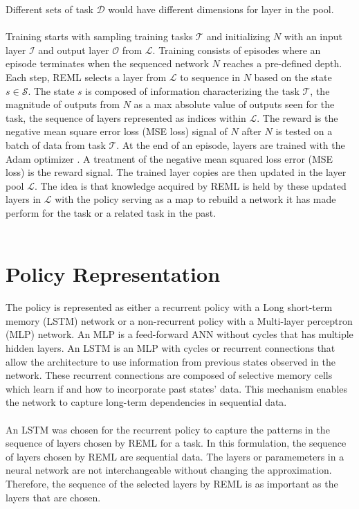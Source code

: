 Different sets of task $\mathcal{D}$ would have different dimensions for layer in
the pool.
\\\\
Training starts with sampling training tasks $\mathcal{T}$ and initializing $N$ 
with an input layer $\mathcal{I}$ and output layer $\mathcal{O}$ from $\mathcal{L}$.
Training consists of episodes where an episode terminates when the 
sequenced network $N$ reaches a pre-defined depth. 
Each step, REML selects a layer from $\mathcal{L}$ to sequence in $N$ based on the
state $s \in \mathcal{S}$. 
The state $s$ is composed of 
information characterizing the task $\mathcal{T}$, 
the magnitude of outputs from $N$ as a max absolute value of outputs seen for the task, 
the sequence of layers represented as indices within $\mathcal{L}$.
The reward is the negative mean square error loss (MSE loss) signal of $N$ after $N$
is tested on a batch of data from task $\mathcal{T}$.
At the end of an episode, layers are trained with the Adam optimizer \cite{KinBa:14}. A treatment of the negative mean 
squared loss error (MSE loss) is the reward signal. 
The trained layer copies are then updated in the layer pool $\mathcal{L}$. 
The idea is that knowledge acquired by REML is held by these updated layers in 
$\mathcal{L}$ with the policy serving as a map to rebuild a network it has made 
perform for the task or a related task in the past.
\\\\
\section{Policy Representation}
The policy is represented as either a recurrent policy with a Long short-term 
memory (LSTM) network or a non-recurrent policy with a Multi-layer perceptron (MLP) 
network. An MLP is a feed-forward ANN without cycles that has multiple hidden layers.
An LSTM is an MLP with cycles or recurrent connections that allow the architecture 
to use information from previous states observed in the network. These recurrent 
connections are composed of selective memory cells which learn if and how to 
incorporate past states' data. This mechanism enables the network to capture long-term
dependencies in sequential data.
\\\\
An LSTM was chosen for the recurrent policy to capture the patterns in the sequence 
of layers chosen by REML for a task. In this formulation, the sequence
of layers chosen by REML are sequential data. The layers or paramemeters in 
a neural network are not interchangeable without changing the approximation. 
Therefore, the sequence of the selected layers by REML is as important as the layers
that are chosen.

